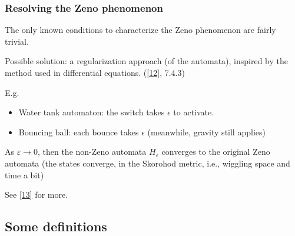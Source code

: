 \documentclass{beamer}
\begin{document}
\begin{frame}
	\frametitle{Resolving the Zeno phenomenon}
	The only known conditions to characterize the Zeno phenomenon are fairly trivial. \newline
	
	Possible solution: a regularization approach (of the automata), inspired by the method used in differential equations. (\href{http://cms.dm.uba.ar/depto/public/grado/fascgrado7.pdf}{[12]}, 7.4.3) \newline
	
	E.g. 
	\begin{itemize}
		\item Water tank automaton: the switch takes $\epsilon$ to activate.
		\item Bouncing ball: each bounce takes $\epsilon$ (meanwhile, gravity still applies) 		
	\end{itemize}
	
	As $\varepsilon \rightarrow 0$, then the non-Zeno automata $H_\varepsilon $ converges to the original Zeno automata (the states converge, in the Skorohod metric, i.e., wiggling space and time a bit) \newline
	
		
	 See \href{http://users.ece.gatech.edu/magnus/Papers/ZenoAutomata.pdf}{[13]} for more.
			
\end{frame}

\subsection{Some definitions}
\end{document}
